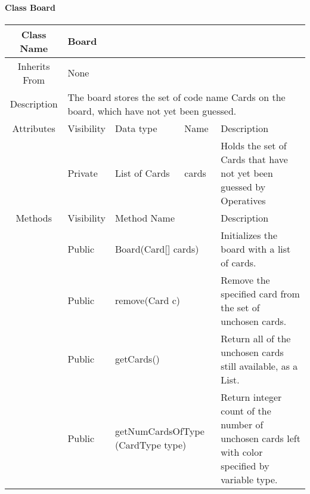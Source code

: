 \paragraph{Class Board}\mbox{}
 \begin{tabularx}{\textwidth}{|c||l|l|l|X|}
    \hline
    \cellcolor{lightgray}Class Name & \multicolumn{4}{X|}{Board}\\
    \hline
    \cellcolor{lightgray}Inherits From & \multicolumn{4}{X|}{None}\\
    \hline
    \cellcolor{lightgray}Description & \multicolumn{4}{p{12cm}|}{The board stores the set of code name Cards on the board, which have not yet been guessed.}\\
    \hline\hline
    \cellcolor{lightgray}Attributes & \cellcolor{lightgray}Visibility & \cellcolor{lightgray}Data type & \cellcolor{lightgray}Name & \cellcolor{lightgray}Description\\\cline{2-5}
    \cellcolor{lightgray} & Private & List of Cards & cards & Holds the set of Cards that have not yet been guessed by Operatives\\
    \hline\hline
    
    \cellcolor{lightgray}Methods & \cellcolor{lightgray}Visibility & \multicolumn{2}{l|}{\cellcolor{lightgray}Method Name} & \cellcolor{lightgray}Description\\\cline{2-5}
    \cellcolor{lightgray} & Public & \multicolumn{2}{l|}{Board(Card[] cards)} & Initializes the board with a list of cards.\\
    \hline
    \cellcolor{lightgray} & Public & \multicolumn{2}{l|}{remove(Card c)} & Remove the specified card from the set of unchosen cards.\\
    \hline
    \cellcolor{lightgray} & Public & \multicolumn{2}{l|}{getCards()} & Return all of the unchosen cards still available, as a List.\\
    \hline
    \cellcolor{lightgray} & Public & \multicolumn{2}{X|}{getNumCardsOfType (CardType type)} & Return integer count of the number of unchosen cards left with color specified by variable type.\\
    \hline
\end{tabularx}